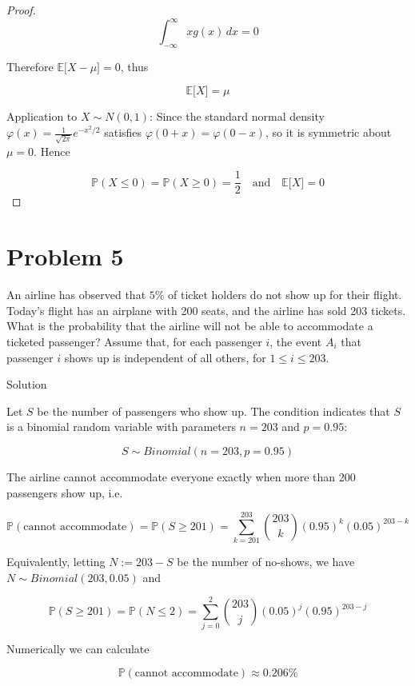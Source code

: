 \begin{proof}
\[\int_{- \infty}^{\infty}\mathit{x}\mathit{g}(\mathit{x})\,\mathit{d}\mathit{x} = 0\]

Therefore \(\mathbb{E}\lbrack\mathit{X} - \mathit{\mu}\rbrack = 0\), thus

\[\mathbb{E}\lbrack\mathit{X}\rbrack = \mathit{\mu}\]

Application to \(\mathit{X} \sim \mathit{N}(0,1)\): Since the standard normal density \(\mathit{\varphi}(\mathit{x}) = \frac{1}{\sqrt{2\mathit{\pi}}}\mathit{e}^{- \mathit{x}^{2}/2}\) satisfies \(\mathit{\varphi}(0 + \mathit{x}) = \mathit{\varphi}(0 - \mathit{x})\), so it is symmetric about \(\mathit{\mu} = 0\). Hence

\[\mathbb{P}(\mathit{X} \leq 0) = \mathbb{P}(\mathit{X} \geq 0) = \frac{1}{2}\quad\text{and}\quad\mathbb{E}\lbrack\mathit{X}\rbrack = 0\]

\end{proof}

\section{Problem 5}\label{hw02-problem-5}

An airline has observed that \(5\%\) of ticket holders do not show up for their flight. Today's flight has an airplane with 200 seats, and the airline has sold 203 tickets. What is the probability that the airline will not be able to accommodate a ticketed passenger? Assume that, for each passenger \(\mathit{i}\), the event \(\mathit{A}_{\mathit{i}}\) that passenger \(\mathit{i}\) shows up is independent of all others, for \(1 \leq \mathit{i} \leq 203\).

\begin{qlsolution}{Solution}

Let \(\mathit{S}\) be the number of passengers who show up. The condition indicates that \(\mathit{S}\) is a binomial random variable with parameters \(\mathit{n} = 203\) and \(\mathit{p} = 0.95\):

\[\mathit{S} \sim Binomial(\mathit{n} = 203,\mathit{p} = 0.95)\]

The airline cannot accommodate everyone exactly when more than 200 passengers show up, i.e.

\[\mathbb{P}(\text{cannot accommodate}) = \mathbb{P}(\mathit{S} \geq 201) = \sum\limits_{\mathit{k} = 201}^{203}\binom{203}{\mathit{k}}(0.95)^{\mathit{k}}(0.05)^{203 - \mathit{k}}\]

Equivalently, letting \(\mathit{N} := 203 - \mathit{S}\) be the number of no-shows, we have \(\mathit{N} \sim Binomial(203,0.05)\) and

\[\mathbb{P}(\mathit{S} \geq 201) = \mathbb{P}(\mathit{N} \leq 2) = \sum\limits_{\mathit{j} = 0}^{2}\binom{203}{\mathit{j}}(0.05)^{\mathit{j}}(0.95)^{203 - \mathit{j}}\]

Numerically we can calculate

\[\mathbb{P}(\text{cannot accommodate}) \approx 0.206\%\]

\end{qlsolution}

